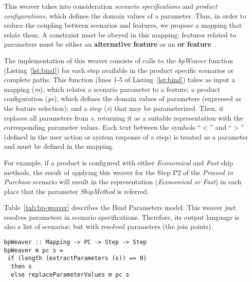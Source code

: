 This weaver takes into consideration \emph{scenario specifications} and
\emph{product configurations}, which defines the domain values of a
parameter. Thus, in order to reduce the coupling between scenarios and features,
we propose a mapping that relate them. A constraint must be obeyed in this mapping: features related to parameters must be either an {\bf alternative feature} or an {\bf or feature}~\cite{gheyi-alloy-06,czarnecki-wsfactory-2005,czarnecki-book}.

The implementation of this weaver consists of calls to
the \emph{bpWeaver} function (Listing~\ref{lst:bind}) for each step
available in the product specific scenarios or complete paths. This
function (lines 1-5 of Listing~\ref{lst:bind}) takes as
input a mapping (\emph{m}), which relates a scenario parameter to a
feature; a product configuration (\emph{pc}), which defines
the domain values of parameters (expressed as the feature selection); and a step (\emph{s}) that may be parameterized. Then, it replaces all parameters
from \emph{s}, returning it as a suitable representation with the
corresponding parameter values. Each text between the symbols ``$<$'' and ``$>$''
(defined in the user action or system response of a
step) is treated as a parameter and must be defined in the
mapping.

For example, if a product is configured with either \emph{Economical} and
\emph{Fast} ship methods, the result of applying this weaver for
the Step P2 of the \emph{Proceed to Purchase} scenario will result in the
representation (\emph{Economical or Fast}) in each place that the parameter \emph{ShipMethod} is referred.

Table~\ref{tab:bp-weaver} describes the Bind Parameters model. This weaver just resolves parameters in scenario specifications. Therefore, its output language is also a list of scenarios; but with resolved parameters (the join points).

\begin{lstlisting}[belowskip=10pt,frame=tb,caption={Bind parameter weaver function},label=lst:bind]
bpWeaver :: Mapping -> PC -> Step -> Step
bpWeaver m pc s =
 if (length (extractParameters (s)) == 0)
  then s
  else replaceParameterValues m pc s
\end{lstlisting}


